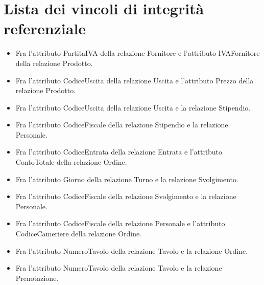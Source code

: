 \section{Lista dei vincoli di integrità referenziale}
\begin{itemize}
    \item Fra l'attributo PartitaIVA della relazione Fornitore e l'attributo IVAFornitore della relazione Prodotto.
    \item Fra l'attributo CodiceUscita della relazione Uscita e l'attributo Prezzo della relazione Prodotto.
    \item Fra l'attributo CodiceUscita della relazione Uscita e la relazione Stipendio.
    \item Fra l'attributo CodiceFiscale della relazione Stipendio e la relazione Personale.
    \item Fra l'attributo CodiceEntrata della relazione Entrata e l'attributo ContoTotale della relazione Ordine.
    \item Fra l'attributo Giorno della relazione Turno e la relazione Svolgimento.
    \item Fra l'attributo CodiceFiscale della relazione Svolgimento e la relazione Personale.
    \item Fra l'attributo CodiceFiscale della relazione Personale e l'attributo CodiceCameriere della relazione Ordine.
    \item Fra l'attributo NumeroTavolo della relazione Tavolo e la relazione Ordine.
    \item Fra l'attributo NumeroTavolo della relazione Tavolo e la relazione Prenotazione.
\end{itemize}
